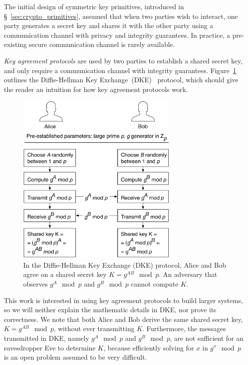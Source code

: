 \label{sec:key_agreement}

The initial design of symmetric key primitives, introduced in
\S~\ref{sec:crypto_primitives}, assumed that when two parties wish to interact,
one party generates a secret key and shares it with the other party using a
communication channel with privacy and integrity guarantees. In practice, a
pre-existing secure communication channel is rarely available.

\textit{Key agreement protocols} are used by two parties to establish a shared
secret key, and only require a communication channel with integrity guarantees.
Figure~\ref{fig:dh_key_exchange} outlines the Diffie-Hellman Key
Exchange~(DKE)~\cite{diffie1976keyexchange} protocol, which should give the
reader an intuition for how key agreement protocols work.

\begin{figure}[hbt]
  \centering
  \includegraphics[width=80mm]{figures/dh_key_exchange.pdf}
  \caption{
    In the Diffie-Hellman Key Exchange (DKE) protocol, Alice and Bob
    agree on a shared secret key $K = g^{AB} \mod p$. An adversary that
    observes $g^{A} \mod p$ and $g^{B} \mod p$ cannot compute $K$.
  }
  \label{fig:dh_key_exchange}
\end{figure}

This work is interested in using key agreement protocols to build larger
systems, so we will neither explain the mathematic details in DKE, nor prove
its correctness. We note that both Alice and Bob derive the same shared secret
key, $K = g^{AB} \mod p$, without ever transmitting $K$. Furthermore, the
messages transmitted in DKE, namely $g^{A} \mod p$ and $g^{B} \mod p$, are not
sufficient for an eavesdropper Eve to determine $K$, because efficiently
solving for $x$ in $g^{x} \mod p$ is an open problem assumed to be very
difficult.

